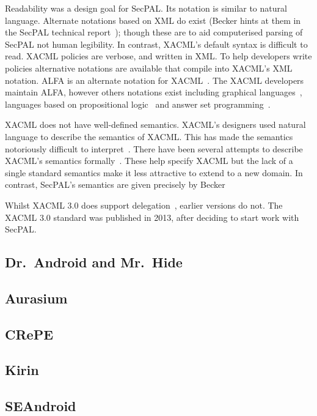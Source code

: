 \documentclass[thesis.tex]{subfiles}
\begin{document}
Readability was a design goal for SecPAL. Its notation is similar to natural
language. Alternate notations based on XML do exist (Becker hints at them in the
SecPAL technical report~\cite{becker_secpal:_2010}); though these are to aid
computerised parsing of SecPAL not human legibility. In contrast, XACML's
default syntax is difficult to read. XACML policies are verbose, and written in
XML. To help developers write policies alternative notations are available that
compile into XACML's XML notation. ALFA is an alternate notation for
XACML~\cite{oasis_xacml_technical_comitee_abbreviated_????}. The XACML
developers maintain ALFA, however others notations exist including graphical
languages~\cite{henrik_nergaard_scratch-based_2015}, languages based on
propositional logic~\cite{zhang_synthesising_2004} and answer set
programming~\cite{ramli_xacml_2012}.

XACML does not have well-defined semantics. XACML's designers used natural
language to describe the semantics of XACML. This has made the semantics
notoriously difficult to interpret~\cite{ramli_detecting_2015}. There have been
several attempts to describe XACML's semantics
formally~\cite{ramli_xacml_2012,ramli_logic_2014,bryans_reasoning_2005}. These
help specify XACML but the lack of a single standard semantics make it less
attractive to extend to a new domain. In contrast, SecPAL's semantics are given
precisely by Becker~\cite{becker_secpal:_2010}

Whilst XACML 3.0 does support delegation~\cite{oasis_xacml_2010}, earlier
versions do not. The XACML 3.0 standard was published in 2013, after deciding to
start work with SecPAL.


\subsection{Dr.~Android and Mr.~Hide}
\subsection{Aurasium}
\subsection{CRePE}
\subsection{Kirin}
\subsection{SEAndroid}
\end{document}
